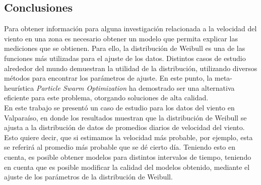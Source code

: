 \subsection{Conclusiones}
Para obtener información para alguna investigación relacionada a la velocidad del viento en una zona es necesario obtener un modelo que permita explicar las mediciones que se obtienen. Para ello, la distribución de Weibull es una de las funciones más utilizadas para el ajuste de los datos.
Distintos casos de estudio alrededor del mundo demuestran la utilidad de la distribución, utilizando diversos métodos para encontrar los parámetros de ajuste.
En este punto, la meta-heurística \emph{Particle Swarm Optimization} ha demostrado ser una alternativa eficiente para este problema, otorgando soluciones 
de alta calidad.\\
En este trabajo se presentó un caso de estudio para los datos del viento en Valparaíso, en donde los resultados muestran que la distribución de Weibull
se ajusta a la distribución de datos de promedios diarios de velocidad del viento. Esto quiere decir, que si estimamos la velocidad más probable, por ejemplo, 
esta se referirá al promedio más probable que se dé cierto día. Teniendo esto en cuenta, es posible obtener modelos para distintos intervalos de tiempo,
teniendo en cuenta que es posible modificar la calidad del modelos obtenido, mediante el ajuste de los parámetros de la distribución de Weibull.


